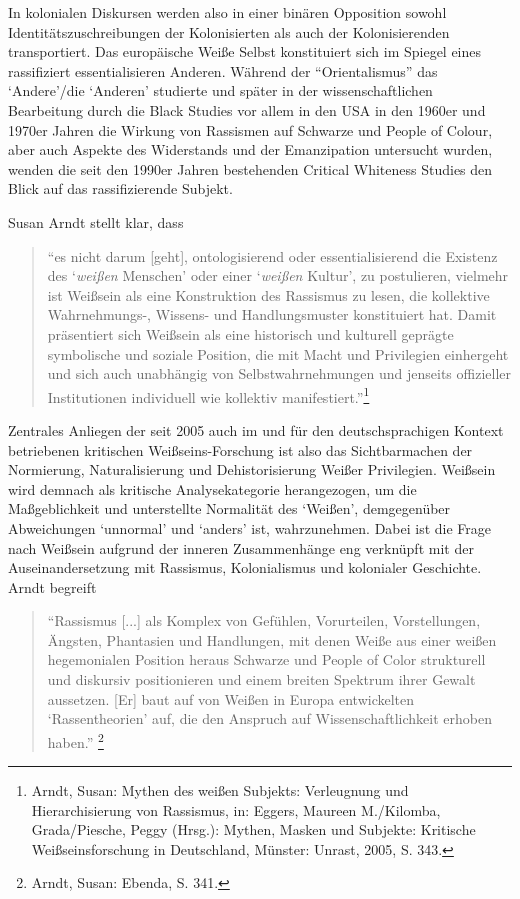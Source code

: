 \documentclass[a4paper,
fontsize=11pt,
oneside,
numbers=noperiodatend,
parskip=half-,
bibliography=totoc,
final
]{scrartcl}
\begin{document}
In kolonialen Diskursen werden also in einer binären Opposition sowohl
Identitätszuschreibungen der Kolonisierten als auch der Kolonisierenden
transportiert. Das europäische Weiße Selbst konstituiert sich im Spiegel
eines rassifiziert essentialisieren Anderen. Während der
\enquote{Orientalismus} das \enquote*{Andere}/die \enquote*{Anderen}
studierte und später in der wissenschaftlichen Bearbeitung durch die
Black Studies vor allem in den USA in den 1960er und 1970er Jahren die
Wirkung von Rassismen auf Schwarze und People of Colour, aber auch
Aspekte des Widerstands und der Emanzipation untersucht wurden, wenden
die seit den 1990er Jahren bestehenden Critical Whiteness Studies den
Blick auf das rassifizierende Subjekt.

Susan Arndt stellt klar, dass

\begin{quote}
\enquote{es nicht darum {[}geht{]}, ontologisierend oder
essentialisierend die Existenz des \enquote*{\emph{weißen} Menschen}
oder einer \enquote*{\emph{weißen} Kultur}, zu postulieren, vielmehr ist
Weißsein als eine Konstruktion des Rassismus zu lesen, die kollektive
Wahrnehmungs-, Wissens- und Handlungsmuster konstituiert hat. Damit
präsentiert sich Weißsein als eine historisch und kulturell geprägte
symbolische und soziale Position, die mit Macht und Privilegien
einhergeht und sich auch unabhängig von Selbstwahrnehmungen und jenseits
offizieller Institutionen individuell wie kollektiv
manifestiert.}\footnote{Arndt, Susan: Mythen des weißen Subjekts:
  Verleugnung und Hierarchisierung von Rassismus, in: Eggers, Maureen
  M./Kilomba, Grada/Piesche, Peggy (Hrsg.): Mythen, Masken und Subjekte:
  Kritische Weißseinsforschung in Deutschland, Münster: Unrast, 2005, S.
  343.}
\end{quote}

Zentrales Anliegen der seit 2005 auch im und für den deutschsprachigen
Kontext betriebenen kritischen Weißseins-Forschung ist also das
Sichtbarmachen der Normierung, Naturalisierung und Dehistorisierung
Weißer Privilegien. Weißsein wird demnach als kritische Analysekategorie
herangezogen, um die Maßgeblichkeit und unterstellte Normalität des
\enquote*{Weißen}, demgegenüber Abweichungen \enquote*{unnormal} und
\enquote*{anders} ist, wahrzunehmen. Dabei ist die Frage nach Weißsein
aufgrund der inneren Zusammenhänge eng verknüpft mit der
Auseinandersetzung mit Rassismus, Kolonialismus und kolonialer
Geschichte. Arndt begreift

\begin{quote}
\enquote{Rassismus {[}...{]} als Komplex von Gefühlen, Vorurteilen,
Vorstellungen, Ängsten, Phantasien und Handlungen, mit denen Weiße aus
einer weißen hegemonialen Position heraus Schwarze und People of Color
strukturell und diskursiv positionieren und einem breiten Spektrum ihrer
Gewalt aussetzen. {[}Er{]} baut auf von Weißen in Europa entwickelten
\enquote*{Rassentheorien} auf, die den Anspruch auf Wissenschaftlichkeit
erhoben haben.} \footnote{Arndt, Susan: Ebenda, S. 341.}
\end{quote}
\end{document}
